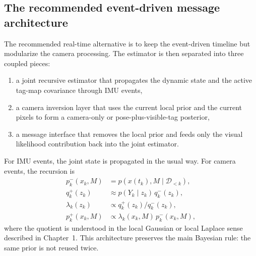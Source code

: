 \documentclass[11pt]{report}
\begin{document}
\subsection{The recommended event-driven message architecture}
The recommended real-time alternative is to keep the event-driven timeline but modularize the camera processing. The estimator is then separated into three coupled pieces:
\begin{enumerate}
    \item a joint recursive estimator that propagates the dynamic state and the active tag-map covariance through IMU events,
    \item a camera inversion layer that uses the current local prior and the current pixels to form a camera-only or pose-plus-visible-tag posterior,
    \item a message interface that removes the local prior and feeds only the visual likelihood contribution back into the joint estimator.
\end{enumerate}
For IMU events, the joint state is propagated in the usual way. For camera events, the recursion is
\begin{align}
p^-_k(x_k,M) &= p(x(t_k),M\mid \mathcal D_{<k}),\\
q_k^+(z_k) &\approx p(Y_k\mid z_k)\,q_k^-(z_k),\\
\lambda_k(z_k) &\propto q_k^+(z_k) / q_k^-(z_k),\\
p^+_k(x_k,M) &\propto \lambda_k(x_k,M)\,p^-_k(x_k,M),
\end{align}
where the quotient is understood in the local Gaussian or local Laplace sense described in Chapter~1. This architecture preserves the main Bayesian rule: the same prior is not reused twice.
\end{document}
